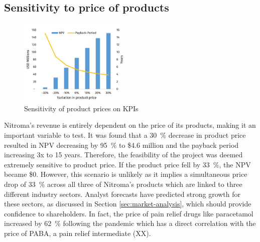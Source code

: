 \subsection{Sensitivity to price of products}
\begin{figure}
    \vspace{-0.9cm}
    \caption{Sensitivity of product prices on KPIs}
    \label{Sensitivity_ProductPrice}
    \includegraphics[width=0.47\textwidth]{chapters/6-economics/figures/Sensitivity_ProductPrice.jpg}
\end{figure}
Nitroma’s revenue is entirely dependent on the price of its products, making it an important variable to test. It was found that a \SI{30}{\percent} decrease in product price resulted in NPV decreasing by \SI{95}{\percent} to \$4.6 million and the payback period increasing 3x to 15 years. Therefore, the feasibility of the project was deemed extremely sensitive to product price.  If the product price fell by \SI{33}{\percent}, the NPV became \$0. However, this scenario is unlikely as it implies a simultaneous price drop of \SI{33}{\percent} across all three of Nitroma’s products which are linked to three different industry sectors. Analyst forecasts have predicted strong growth for these sectors, as discussed in Section \ref{sec:market-analysis}, which should provide confidence to shareholders. In fact, the price of pain relief drugs like paracetamol increased by \SI{62}{\percent} following the pandemic which has a direct correlation with the price of PABA, a pain relief intermediate (XX).

